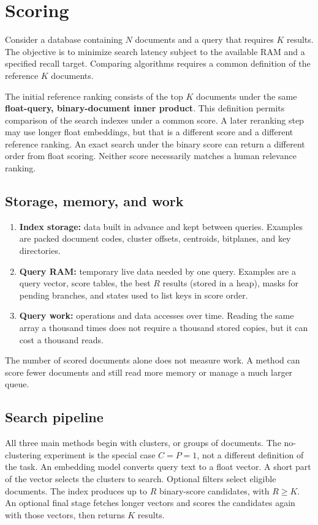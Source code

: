 \section{Scoring}
\label{sec:foundations}
Consider a database containing $N$ documents and a query that requires $K$
results. The objective is to minimize search latency subject to the available RAM and a
specified recall target. Comparing algorithms requires a common definition of the reference
$K$ documents.

The initial reference ranking consists of the top $K$ documents under the same
\textbf{float-query, binary-document inner product}. This definition permits comparison of the search indexes under a common score. A later
reranking step may use longer float embeddings, but that is a different score and a different
reference ranking. An exact search under the binary score can return a different order from float scoring.
Neither score necessarily matches a human relevance ranking.

\subsection{Storage, memory, and work}
\begin{enumerate}
\item \textbf{Index storage:} data built in advance and kept between queries. Examples are
packed document codes, cluster offsets, centroids, bitplanes, and key directories.
\item \textbf{Query RAM:} temporary live data needed by one query. Examples are a query vector,
score tables, the best $R$ results (stored in a heap), masks for pending branches, and states used to
list keys in score order.
\item \textbf{Query work:} operations and data accesses over time. Reading the same array a
thousand times does not require a thousand stored copies, but it can cost a thousand reads.
\end{enumerate}
The number of scored documents alone does not measure work. A method can score fewer documents
and still read more memory or manage a much larger queue.

\subsection{Search pipeline}
All three main methods begin with clusters, or groups of documents. The no-clustering experiment is the special
case $C=P=1$, not a different definition of the task.
An embedding model converts query text to a float vector. A short part of the vector selects the
clusters to search. Optional filters select eligible documents. The index produces
up to $R$ binary-score candidates, with $R\geq K$. An optional final stage fetches longer
vectors and scores the candidates again with those vectors, then returns $K$ results.

